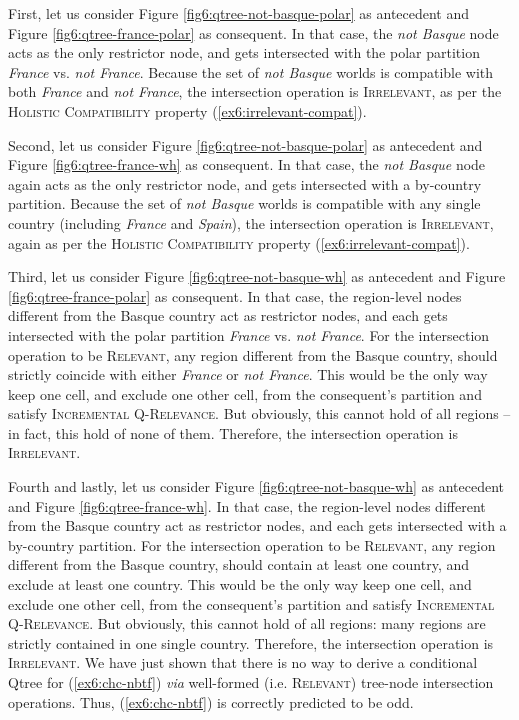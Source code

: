 First, let us consider Figure \ref{fig6:qtree-not-basque-polar} as antecedent and Figure \ref{fig6:qtree-france-polar} as consequent. In that case, the \textit{not Basque} node acts as the only restrictor node, and gets intersected with the polar partition \textit{France} vs. \textit{not France}. Because the set of \textit{not Basque} worlds is compatible with both \textit{France} and \textit{not France}, the intersection operation is \textsc{Irrelevant}, as per the \textsc{Holistic Compatibility} property (\ref{ex6:irrelevant-compat}).

Second, let us consider Figure \ref{fig6:qtree-not-basque-polar} as antecedent and Figure \ref{fig6:qtree-france-wh} as consequent. In that case, the \textit{not Basque} node again acts as the only restrictor node, and gets intersected with a by-country partition. Because the set of \textit{not Basque} worlds is compatible with any single country (including \textit{France} and \textit{Spain}), the intersection operation is \textsc{Irrelevant}, again as per the \textsc{Holistic Compatibility} property (\ref{ex6:irrelevant-compat}).

Third, let us consider Figure \ref{fig6:qtree-not-basque-wh} as antecedent and Figure \ref{fig6:qtree-france-polar} as consequent. In that case, the region-level nodes different from the Basque country act as restrictor nodes, and each gets intersected with the polar partition \textit{France} vs. \textit{not France}. For the intersection operation to be \textsc{Relevant}, any region different from the Basque country, should strictly coincide with either \textit{France} or \textit{not France}. This would be the only way keep one cell, and exclude one other cell, from the consequent's partition and satisfy \textsc{Incremental Q-Relevance}. But obviously, this cannot hold of all regions -- in fact, this hold of none of them. Therefore, the intersection operation is \textsc{Irrelevant}.

Fourth and lastly, let us consider Figure \ref{fig6:qtree-not-basque-wh} as antecedent and Figure \ref{fig6:qtree-france-wh}. In that case, the region-level nodes different from the Basque country act as restrictor nodes, and each gets intersected with a by-country partition. For the intersection operation to be \textsc{Relevant}, any region different from the Basque country, should contain at least one country, and exclude at least one country. This would be the only way keep one cell, and exclude one other cell, from the consequent's partition and satisfy \textsc{Incremental Q-Relevance}. But obviously, this cannot hold of all regions: many regions are strictly contained in one single country. Therefore, the intersection operation is \textsc{Irrelevant}. We have just shown that there is no way to derive a conditional Qtree for (\ref{ex6:chc-nbtf}) \textit{via} well-formed (i.e. \textsc{Relevant}) tree-node intersection operations. Thus, (\ref{ex6:chc-nbtf}) is correctly predicted to be odd.\\

